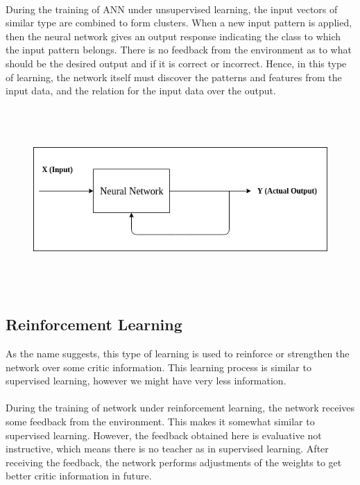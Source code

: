\documentclass{report}
\begin{document}
\paragraph{}
During the training of ANN under unsupervised learning, the input vectors of similar type are combined to form clusters. When a new input pattern is applied, then the neural network gives an output response indicating the class to which the input pattern belongs.
There is no feedback from the environment as to what should be the desired output and if it is correct or incorrect. Hence, in this type of learning, the network itself must discover the patterns and features from the input data, and the relation for the input data over the output.

\begin{figure}[htbp]
\centering
\includegraphics[height=7cm,width = 16cm]{Pictures/Unsupervised Learning.png}
\caption{}
\label{}
\end{figure}

\subsection{Reinforcement Learning}

As the name suggests, this type of learning is used to reinforce or strengthen the network over some critic information. This learning process is similar to supervised learning, however we might have very less information.
\paragraph{}
During the training of network under reinforcement learning, the network receives some feedback from the environment. This makes it somewhat similar to supervised learning. However, the feedback obtained here is evaluative not instructive, which means there is no teacher as in supervised learning. After receiving the feedback, the network performs adjustments of the weights to get better critic information in future.
\end{document}
